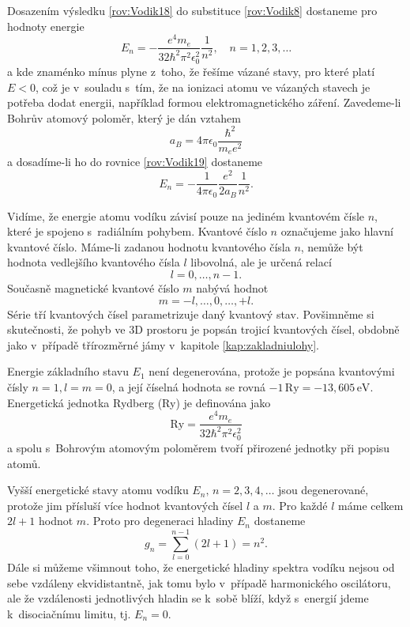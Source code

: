 Dosazením výsledku \eqref{rov:Vodik18} do substituce \eqref{rov:Vodik8} dostaneme pro hodnoty energie 
\begin{equation}
E_n = - \frac{e^4 m_e}{32 \hbar^2 \pi^2 \epsilon_0^2} \frac{1}{n^2}, \quad n=1, 2, 3, \dots
\label{rov:Vodik19}
\end{equation}
a kde znaménko mínus plyne z~toho, že řešíme vázané stavy, pro které platí $E<0$, což je v~souladu s~tím, že na ionizaci atomu ve vázaných stavech je potřeba dodat energii, například formou elektromagnetického záření. Zavedeme-li Bohrův atomový poloměr, který je dán vztahem
\begin{equation}
a_B = 4 \pi \epsilon_0 \frac{\hbar^2}{m_e e^2}
\label{rov:Vodik20}
\end{equation}
a dosadíme-li ho do rovnice \eqref{rov:Vodik19} dostaneme
\begin{equation}
E_n = - \frac{1}{4 \pi \epsilon_0}\frac{e^2}{2a_B}\frac{1}{n^2} \mbox{.}
\label{rov:Vodik21}
\end{equation}

Vidíme, že energie atomu vodíku závisí pouze na jediném kvantovém čísle $n$, které je spojeno s~radiálním pohybem. Kvantové číslo $n$ označujeme jako hlavní kvantové číslo. Máme-li zadanou hodnotu kvantového čísla $n$, nemůže být hodnota vedlejšího kvantového čísla $l$ libovolná, ale je určená relací
\begin{equation}
l = 0, \dots, n-1 \mbox{.}
\label{rov:Vodik22}
\end{equation}
Současně magnetické kvantové číslo $m$ nabývá hodnot
\begin{equation}
m = -l, \dots, 0, \dots, +l \mbox{.}
\label{rov:Vodik23}
\end{equation}
Série tří kvantových čísel parametrizuje daný kvantový stav. Povšimněme si skutečnosti, že pohyb ve 3D prostoru je popsán trojicí kvantových čísel, obdobně jako v~případě třírozměrné jámy v~kapitole \ref{kap:zakladniulohy}.

Energie základního stavu $E_1$ není degenerována, protože je popsána kvantovými čísly $n=1, l=m=0$, a její číselná hodnota se rovná $- 1 \,\mbox{Ry} = - 13,605 \,\mbox{eV}$. Energetická jednotka Rydberg (Ry) je definována jako
\begin{equation}
\mbox{Ry} = \frac{e^4 m_e}{32 \hbar^2 \pi^2 \epsilon_0^2}
\label{rov:Vodik24}
\end{equation}
a spolu s~Bohrovým atomovým poloměrem tvoří přirozené jednotky při popisu atomů.

Vyšší energetické stavy atomu vodíku $E_n, \,n=2,3,4, \dots$ jsou degenerované, protože jim přísluší více hodnot kvantových čísel $l$ a $m$. Pro každé $l$ máme celkem $2l+1$ hodnot $m$. Proto pro degeneraci hladiny $E_n$ dostaneme
\begin{equation}
g_n = \sum_{l=0}^{n-1}(2l+1) = n^2 \mbox{.}
\label{rov:Vodik25}
\end{equation}
Dále si můžeme všimnout toho, že energetické hladiny spektra vodíku nejsou od sebe vzdáleny ekvidistantně, jak tomu bylo v~případě harmonického oscilátoru, ale že vzdálenosti jednotlivých hladin se k~sobě blíží, když s~energií jdeme k~disociačnímu limitu, tj. $E_n=0$.


